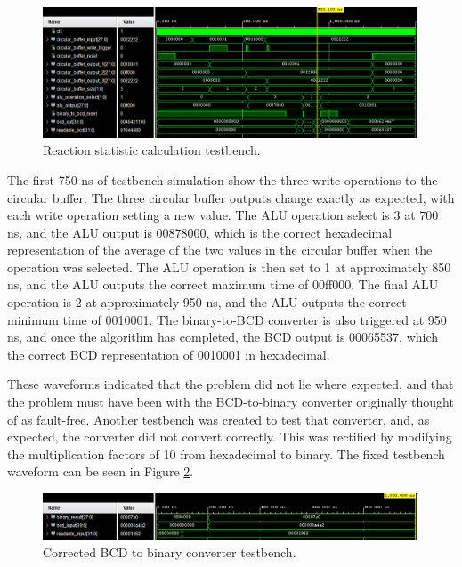 \documentclass[11pt]{article}
\begin{document}
\begin{figure}[H]
  \centering
  \includegraphics[width=0.99\textwidth]{thing.jpeg}
  \caption{Reaction statistic calculation testbench.}
  \label{fig:alu_testbench}
\end{figure}

The first 750 ns of testbench simulation show the three write operations to the circular buffer. The three circular buffer outputs change exactly as expected, with each write operation setting a new value. The ALU operation select is 3 at 700 ns, and the ALU output is 00878000, which is the correct hexadecimal representation of the average of the two values in the circular buffer when the operation was selected. The ALU operation is then set to 1 at approximately 850 ns, and the ALU outputs the correct maximum time of 00ff000. The final ALU operation is 2 at approximately 950 ns, and the ALU outputs the correct minimum time of 0010001. The binary-to-BCD converter is also triggered at 950 ns, and once the algorithm has completed, the BCD output is 00065537, which the correct BCD representation of 0010001 in hexadecimal.

These waveforms indicated that the problem did not lie where expected, and that the problem must have been with the BCD-to-binary converter originally thought of as fault-free. Another testbench was created to test that converter, and, as expected, the converter did not convert correctly. This was rectified by modifying the multiplication factors of 10 from hexadecimal to binary. The fixed testbench waveform can be seen in Figure \ref{fig:correct_converter_tb}.

\begin{figure}[H]
  \centering
  \includegraphics[width=0.99\textwidth]{WhatsApp Image 2025-05-08 at 16.13.24}
  \caption{Corrected BCD to binary converter testbench.}
  \label{fig:correct_converter_tb}
\end{figure}
\end{document}

